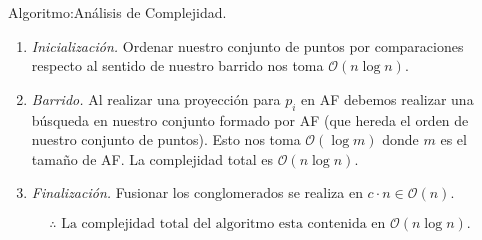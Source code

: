 
\begin{frame}[fragile]{Algoritmo:}{Análisis de Complejidad.}
  \begin{enumerate}
  \item \textit{Inicialización.} Ordenar nuestro conjunto de puntos por comparaciones respecto
    al sentido de nuestro barrido nos toma $\mathcal{O}(n \log n)$.
  \item \textit{Barrido.} Al realizar una proyección para $p_i$ en AF debemos realizar una
    búsqueda en nuestro conjunto formado por AF (que hereda el orden de nuestro conjunto de puntos).
    Esto nos toma $\mathcal{O}(\log m)$ donde $m$ es el tamaño de AF. La complejidad total es $\mathcal{O}(n \log n)$.
  \item \textit{Finalización.} Fusionar los conglomerados se realiza en $c \cdot n \in \mathcal{O}(n).$
  \end{enumerate}
  
  \[\therefore \text{ La complejidad total del algoritmo esta contenida en } \mathcal{O}(n \log n).\]
\end{frame}
